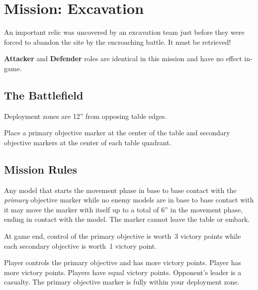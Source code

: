 \clearpage
\section{Mission: Excavation}

  An important relic was uncovered by an excavation team just before
  they were forced to abandon the site by the encroaching battle.  It
  must be retrieved!

  \begin{squishitemize}
  \item \textbf{Attacker} and \textbf{Defender} roles are identical in
    this mission and have no effect in-game.
  \end{squishitemize}


\subsection{\bf The Battlefield}%

Deployment zones are 12'' from opposing table edges.

Place a primary objective marker at the center of the table and
secondary objective markers at the center of each table quadrant.


\subsection{\bf Mission Rules}%

Any model that starts the movement phase in base to base contact with
the \emph{primary} objective marker while no enemy models are in base
to base contact with it may move the marker with itself up to a total
of 6'' in the movement phase, ending in contact with the model.  The
marker cannot leave the table or embark.


At game end, control of the primary objective is worth~3 victory
points while each secondary objective is worth~1 victory point.

\vfill
\scoringbox%
{Player controls the primary objective and has more victory points.}%
{Player has more victory points.}%
{Players have equal victory points.}%
{Opponent's leader is a casualty.}%
{The primary objective marker is fully within your deployment zone.}

